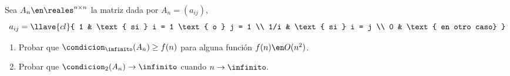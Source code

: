 \begin{enunciado}{\ejercicio}
  Sea $A_n \en \reales^{n \times n}$ la matriz dada por $A_n = (a_{ij})$,
  $$
    a_{ij} =
    \llave{cl}{
      1 & \text{ si } i = 1 \text{ o } j = 1 \\
      1/i & \text{ si } i = j \\
      0 & \text{ en otro caso}
    }
  $$
  \begin{enumerate}[label=\alph*)]
    \item Probar que $\condicion_\infinito (A_n) \geq f(n)$ para alguna función $f(n) \en O(n^2)$.
    \item Probar que $\condicion_2(A_n) \to \infinito$ cuando $n \to \infinito$.
  \end{enumerate}
\end{enunciado}

